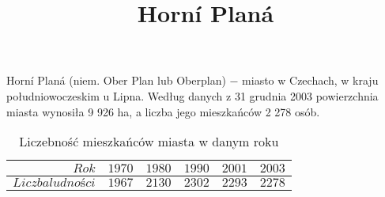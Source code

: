 \documentclass{article}
\begin{document}
\title{Horní Planá}
\maketitle

Horní Planá (niem. Ober Plan lub Oberplan) − miasto w Czechach, w kraju południowoczeskim u Lipna. Według danych z 31 grudnia 2003 powierzchnia miasta wynosiła 9 926 ha, a liczba jego mieszkańców 2 278 osób.

\begin{table}
\centering \caption{Liczebność mieszkańców miasta w danym roku }
\begin{tabular}{|r|r|r|r|r|r|}
\hline
$Rok$ & $1970$ & $1980$ & $1990$ & $2001$ & $2003$ \\
\hline
$Liczba ludności$ & $1967$ & $2130$ & $2302$ & $2293$ & $2278$ \\
\hline
\end{tabular}
\end{table}
\end{document}
